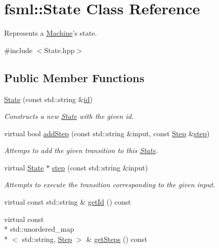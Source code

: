 \hypertarget{classfsml_1_1State}{\section{fsml\-:\-:State Class Reference}
\label{classfsml_1_1State}
}


Represents a \hyperlink{classfsml_1_1Machine}{Machine}'s state.  




{\ttfamily \#include $<$State.\-hpp$>$}

\subsection*{Public Member Functions}
\begin{DoxyCompactItemize}
\item 
\hyperlink{classfsml_1_1State_a8aa7803bfefbd8c846ebd8cb81f824ac}{State} (const std\-::string \&\hyperlink{classfsml_1_1State_a4acc37de347d0e4a66d6470a4d6ebcf7}{id})
\begin{DoxyCompactList}\small\item\em Constructs a new \hyperlink{classfsml_1_1State}{State} with the given id. \end{DoxyCompactList}\item 
virtual bool \hyperlink{classfsml_1_1State_a0a28f6f4a995313d9bc85d1fdf51fb9b}{add\-Step} (const std\-::string \&input, const \hyperlink{classfsml_1_1Step}{Step} \&\hyperlink{classfsml_1_1State_a0c7aafd6216a785c159e70f00a12d3f8}{step})
\begin{DoxyCompactList}\small\item\em Attemps to add the given transition to this \hyperlink{classfsml_1_1State}{State}. \end{DoxyCompactList}\item 
virtual \hyperlink{classfsml_1_1State}{State} $\ast$ \hyperlink{classfsml_1_1State_a0c7aafd6216a785c159e70f00a12d3f8}{step} (const std\-::string \&input)
\begin{DoxyCompactList}\small\item\em Attempts to execute the transition corresponding to the given input. \end{DoxyCompactList}\item 
virtual const std\-::string \& \hyperlink{classfsml_1_1State_af13128f0b9cdf6433f4307bb16159477}{get\-Id} () const 
\item 
virtual const \\*
std\-::unordered\-\_\-map\\*
$<$ std\-::string, \hyperlink{classfsml_1_1Step}{Step} $>$ \& \hyperlink{classfsml_1_1State_ad96fe3074f0c3d8bd3dcb9a7cd7e25ed}{get\-Steps} () const 
\end{DoxyCompactItemize}
